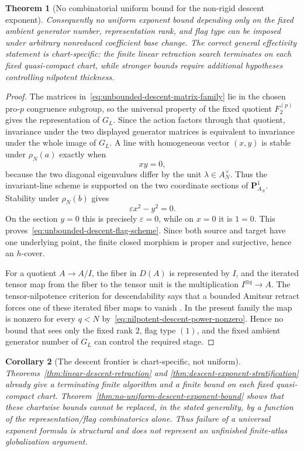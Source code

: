 \documentclass[11pt]{article}
\newtheorem{theorem}{Theorem}[section]
\newtheorem{corollary}[theorem]{Corollary}
\theoremstyle{definition}
\begin{document}
\begin{theorem}[No combinatorial uniform bound for the non-rigid descent exponent]
Consequently no uniform exponent bound depending only on the fixed ambient
generator number, representation rank, and flag type can be imposed under
arbitrary nonreduced coefficient base change.  The correct general effectivity
statement is chart-specific: the finite linear retraction search terminates on
each fixed quasi-compact chart, while stronger bounds require additional
hypotheses controlling nilpotent thickness.
\end{theorem}

\begin{proof}
The matrices in~\eqref{eq:unbounded-descent-matrix-family} lie in the chosen
pro-$p$ congruence subgroup, so the universal property of the fixed quotient
$F_2^{(p)}$ gives the representation of $G_L$.  Since the action factors through
that quotient, invariance under the two displayed generator matrices is
equivalent to invariance under the whole image of $G_L$.  A line with homogeneous vector
$(x,y)$ is stable under $\rho_N(a)$ exactly when
\[
 xy=0,
\]
because the two diagonal eigenvalues differ by the unit $\lambda\in A_N^\times$.
Thus the invariant-line scheme is supported on the two coordinate sections of
$\mathbf P^1_{A_N}$.  Stability under $\rho_N(b)$ gives
\[
 \varepsilon x^2-y^2=0.
\]
On the section $y=0$ this is precisely $\varepsilon=0$, while on $x=0$ it is
$1=0$.  This proves~\eqref{eq:unbounded-descent-flag-scheme}.  Since both source
and target have one underlying point, the finite closed morphism is proper and
surjective, hence an $h$-cover.

For a quotient $A\to A/I$, the fiber in $D(A)$ is represented by $I$, and the
iterated tensor map from the fiber to the tensor unit is the multiplication
$I^{\otimes q}\to A$.  The tensor-nilpotence criterion for descendability says
that a bounded Amitsur retract forces one of these iterated fiber maps to vanish
\cite[Section~3.3]{MathewGalois}.  In the present family the map is nonzero for
every $q<N$ by~\eqref{eq:nilpotent-descent-power-nonzero}.  Hence no bound that sees only the fixed rank $2$, flag type $(1)$, and the
fixed ambient generator number of $G_L$ can control the required stage.
\end{proof}

\begin{corollary}[The descent frontier is chart-specific, not uniform]\label{cor:descent-frontier-chart-specific}
Theorems~\ref{thm:linear-descent-retraction} and
\ref{thm:descent-exponent-stratification} already give a terminating finite
algorithm and a finite bound on each fixed quasi-compact chart.  Theorem~\ref{thm:no-uniform-descent-exponent-bound}
shows that these chartwise bounds cannot be replaced, in the stated generality,
by a function of the representation/flag combinatorics alone.  Thus failure of a
universal exponent formula is structural and does not represent an unfinished
finite-atlas globalization argument.
\end{corollary}
\end{document}
